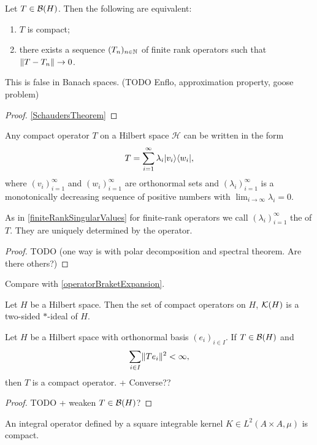\begin{proposition}
Let $T\in\operatorname{\mathcal{B}}(H)$. Then the following are equivalent:
\begin{enumerate}
\item $T$ is compact;
\item there exists a sequence $(T_n)_{n\in\mathbb{N}}$ of finite rank operators such that $\lVert T-T_n\rVert\to 0$.
\end{enumerate}
\end{proposition}
This is false in Banach spaces. (TODO Enflo, approximation property, goose problem)
\begin{proof}
\ref{SchaudersTheorem}
\end{proof}
\begin{corollary}
Any compact operator $T$ on a Hilbert space $\mathcal{H}$ can be written in the form
\[ T = \sum_{i=1}^\infty \lambda_i |v_i\rangle\langle w_i|, \]
where $(v_i)_{i=1}^\infty$ and $(w_i)_{i=1}^\infty$ are orthonormal sets and $(\lambda_i)_{i=1}^\infty$ is a monotonically decreasing sequence of positive numbers with $\lim_{i\to\infty}\lambda_i = 0$.
\end{corollary}
As in \ref{finiteRankSingularValues} for finite-rank operators we call $(\lambda_i)_{i=1}^\infty$ the  of $T$. They are uniquely determined by the operator.
\begin{proof}
TODO (one way is with polar decomposition and spectral theorem. Are there others?)
\end{proof}
Compare with \ref{operatorBraketExpansion}.

\begin{lemma}
Let $H$ be a Hilbert space. Then the set of compact operators on $H$, $\operatorname{\mathcal{K}}(H)$ is a two-sided $*$-ideal of $H$. 
\end{lemma}

\begin{proposition}
Let $H$ be a Hilbert space with orthonormal basis $(e_i)_{i\in I}$. If $T\in\operatorname{\mathcal{B}}(H)$ and
\[ \sum_{i\in I}\lVert Te_i\rVert^2  < \infty, \]
then $T$ is a compact operator. + Converse??
\end{proposition}
\begin{proof}
TODO + weaken $T\in\operatorname{\mathcal{B}}(H)$?
\end{proof}
\begin{corollary}
An integral operator defined by a square integrable kernel $K\in L^2(A\times A, \mu)$ is compact.
\end{corollary}

